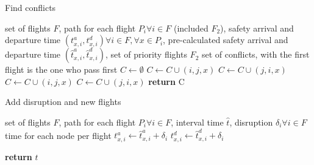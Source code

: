 \documentclass[../main.tex]{subfiles}
\begin{document}
\begin{algorithm}
\begin{algorithmic}
\end{algorithmic}
\end{algorithm}




\begin{algorithm}
\caption{Find conflicts}
\label{algo:findConflicts}
\begin{algorithmic}
\Require set of flights $F$, path for each flight $P_i\forall i\in F$ (included $F_2$), safety arrival and departure time $(t_{x,i}^a,t_{x,i}^d) \forall i\in F, \forall x\in P_i$, pre-calculated safety arrival and departure time $(\hat t_{x,i}^a,\hat t_{x,i}^d)$, set of priority flights $F_2$
\Ensure set of conflicts, with the first flight is the one who pass first
\State $C\gets \emptyset$
                    \State $C \gets C\cup (i,j,x)$
                    \State $C \gets C\cup (j,i,x)$
                \Else
                     
                        \State $C\gets C\cup (i,j,x)$
                    \Else
                        \State $C\gets C\cup (j,i,x)$
                    \EndIf
                \EndIf
            \EndIf
        \EndFor
    \EndFor
\EndFor
\State \textbf{return} C
\end{algorithmic}
\end{algorithm}



\begin{algorithm}
\caption{Add disruption and new flights}
\label{algo:disruption}
\begin{algorithmic}
\Require set of flights $F$, path for each flight $P_i\forall i\in F$, interval time $\hat t$, disruption $\delta_i\forall i \in F$
\Ensure time for each node per flight
        \State $t^a_{x,i}\gets \hat t^a_{x,i} + \delta_i$
        \State $t^d_{x,i}\gets \hat t^d_{x,i} + \delta_i$
    \EndFor
\EndFor

\State \textbf{return} $t$
\end{algorithmic}
\end{algorithm}
\end{document}
